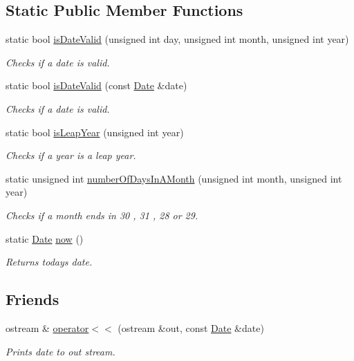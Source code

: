 \subsection*{Static Public Member Functions}
\begin{DoxyCompactItemize}
\item 
static bool \hyperlink{class_date_ad99ae04c84eceaf1374d9f6617ad07cd}{is\+Date\+Valid} (unsigned int day, unsigned int month, unsigned int year)
\begin{DoxyCompactList}\small\item\em Checks if a date is valid. \end{DoxyCompactList}\item 
static bool \hyperlink{class_date_a9e2bc98c0ff058974a3276b4501b1cf5}{is\+Date\+Valid} (const \hyperlink{class_date}{Date} \&date)
\begin{DoxyCompactList}\small\item\em Checks if a date is valid. \end{DoxyCompactList}\item 
static bool \hyperlink{class_date_a11e14d85e1039e5a7fab1444a57cf15b}{is\+Leap\+Year} (unsigned int year)
\begin{DoxyCompactList}\small\item\em Checks if a year is a leap year. \end{DoxyCompactList}\item 
static unsigned int \hyperlink{class_date_ab1cdb098583520c2b4f0abf34162c310}{number\+Of\+Days\+In\+A\+Month} (unsigned int month, unsigned int year)
\begin{DoxyCompactList}\small\item\em Checks if a month ends in 30 , 31 , 28 or 29. \end{DoxyCompactList}\item 
static \hyperlink{class_date}{Date} \hyperlink{class_date_a1dc04a5722b0dbf2d099d8ebf313250b}{now} ()
\begin{DoxyCompactList}\small\item\em Returns today\textquotesingle{}s date. \end{DoxyCompactList}\end{DoxyCompactItemize}
\subsection*{Friends}
\begin{DoxyCompactItemize}
\item 
ostream \& \hyperlink{class_date_a5c29d00ecf33e6d232a410f1f3d6eb70}{operator$<$$<$} (ostream \&out, const \hyperlink{class_date}{Date} \&date)
\begin{DoxyCompactList}\small\item\em Prints date to out stream. \end{DoxyCompactList}\end{DoxyCompactItemize}


